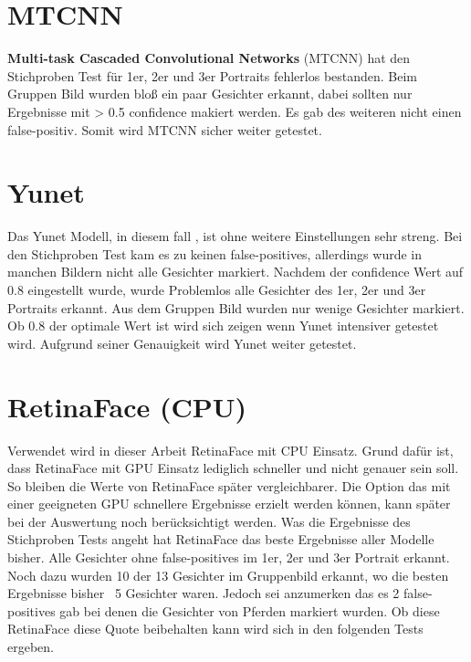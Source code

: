 \section{MTCNN}
\textbf{Multi-task Cascaded Convolutional Networks} (MTCNN) hat den Stichproben Test für 1er, 2er und 3er Portraits fehlerlos bestanden. Beim Gruppen Bild wurden bloß ein paar Gesichter erkannt, dabei sollten nur Ergebnisse mit > 0.5 confidence makiert werden. Es gab des weiteren nicht einen false-positiv. Somit wird MTCNN sicher weiter getestet.

\section{Yunet}
Das Yunet Modell, in diesem fall , ist ohne weitere Einstellungen sehr streng. Bei den Stichproben Test kam es zu keinen false-positives, allerdings wurde in manchen Bildern nicht alle Gesichter markiert. Nachdem der confidence Wert auf 0.8 eingestellt wurde, wurde Problemlos alle Gesichter des 1er, 2er und 3er Portraits erkannt. Aus dem Gruppen Bild wurden nur wenige Gesichter markiert. Ob 0.8 der optimale Wert ist wird sich zeigen wenn Yunet intensiver getestet wird. Aufgrund seiner Genauigkeit wird Yunet weiter getestet.

\section{RetinaFace (CPU)}
Verwendet wird in dieser Arbeit RetinaFace mit CPU Einsatz. Grund dafür ist, dass RetinaFace mit GPU Einsatz lediglich schneller und nicht genauer sein soll. So bleiben die Werte von RetinaFace später vergleichbarer. Die Option das mit einer geeigneten GPU schnellere Ergebnisse erzielt werden können, kann später bei der Auswertung noch berücksichtigt werden. Was die Ergebnisse des Stichproben Tests angeht hat RetinaFace das beste Ergebnisse aller Modelle bisher. Alle Gesichter ohne false-positives im 1er, 2er und 3er Portrait erkannt. Noch dazu wurden 10 der 13 Gesichter im Gruppenbild erkannt, wo die besten Ergebnisse bisher ~5 Gesichter waren. Jedoch sei anzumerken das es 2 false-positives gab bei denen die Gesichter von Pferden markiert wurden. Ob diese RetinaFace diese Quote beibehalten kann wird sich in den folgenden Tests ergeben.